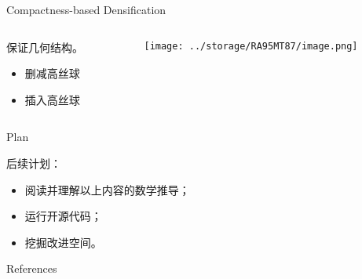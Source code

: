 \documentclass[dark]{sintefbeamer}
\begin{document}
\begin{frame}[fragile]{Compactness-based Densification}
  \begin{columns}
    \begin{column}{0.5\textwidth}
      保证几何结构。
      \begin{itemize}
        \item 删减高丝球
        \item 插入高丝球
      \end{itemize}
  
    \end{column}
    \begin{column}{0.5\textwidth}
      \begin{figure}
        \texttt{[image: ../storage/RA95MT87/image.png]}
      \end{figure}
    \end{column}
  \end{columns}
\end{frame}

\begin{frame}[fragile]{Plan}
  
  后续计划：

  \begin{itemize}
    \item 阅读并理解以上内容的数学推导；
    \item 运行开源代码；
    \item 挖掘改进空间。
  \end{itemize}
 
\end{frame}

\backmatter

\begin{frame}[t, allowframebreaks]{References}{\,}
\framesubtitle{\quad}
\tiny
  
  
\end{frame}
\end{document}
